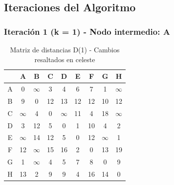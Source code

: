 \documentclass[12pt]{article}
\begin{document}
\clearpage
\subsection{Iteraciones del Algoritmo}
\subsubsection{Iteración 1 (k = 1) - Nodo intermedio: A}
\begin{table}[h!]
\centering
\begin{tabular}{|c|c|c|c|c|c|c|c|c|}
\hline
 & A & B & C & D & E & F & G & H \\\hline
A & 0 & $\infty$ & 3 & 4 & 6 & 7 & 1 & $\infty$ \\\hline
B & 9 & 0 & \cellcolor{lightgreen} 12 & \cellcolor{lightgreen} 13 & 12 & 12 & \cellcolor{lightgreen} 10 & 12 \\\hline
C & $\infty$ & 4 & 0 & $\infty$ & 11 & 4 & 18 & $\infty$ \\\hline
D & 3 & 12 & 5 & 0 & 1 & \cellcolor{lightgreen} 10 & 4 & 2 \\\hline
E & $\infty$ & 14 & 12 & 5 & 0 & 12 & $\infty$ & 1 \\\hline
F & 12 & $\infty$ & \cellcolor{lightgreen} 15 & \cellcolor{lightgreen} 16 & 2 & 0 & \cellcolor{lightgreen} 13 & 19 \\\hline
G & 1 & $\infty$ & \cellcolor{lightgreen} 4 & \cellcolor{lightgreen} 5 & \cellcolor{lightgreen} 7 & \cellcolor{lightgreen} 8 & 0 & 9 \\\hline
H & 13 & 2 & 9 & 9 & 4 & 16 & \cellcolor{lightgreen} 14 & 0 \\\hline
\end{tabular}
\caption{Matriz de distancias D(1) - Cambios resaltados en celeste}
\end{table}
\end{document}

